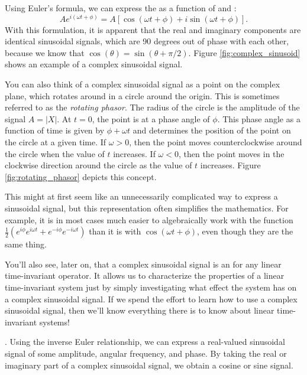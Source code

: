 Using Euler's formula, we can express the 
as a function of \index{$\cos$}{$\cos$} and \index{$\sin$}{$\sin$}:
\begin{equation}
  Ae^{i(\omega t + \phi)}= A[\cos(\omega t + \phi) + i \sin(\omega t + \phi)].
\end{equation}
With this formulation, it is apparent that the real and imaginary components are identical sinusoidal signals,
which are 90 degrees out of phase with each other, because we know that
$\cos(\theta) = \sin(\theta + \pi/2)$. Figure \ref{fig:complex_sinusoid}
shows an example of a complex sinusoidal signal.

You can also think of a complex sinusoidal signal as a point on the complex plane,
which rotates around in a circle around the origin. This is sometimes
referred to as the \emph{rotating phasor}. The radius of the circle is the
amplitude of the signal $A=|X|$. At $t=0$, the point is at a phase angle of $\phi$.
This phase angle as a function of time is given by $\phi + \omega t$ and determines the position
of the point on the circle at a given time. If $\omega>0$, then the point moves counterclockwise
around the circle when the value of $t$ increases. If $\omega < 0$, then the point moves
in the clockwise direction around the circle as the value of $t$ increases.
Figure \ref{fig:rotating_phasor} depicts this concept.

This might at first seem like an unnecessarily complicated way to express a sinusoidal signal,
but this representation often simplifies the mathematics. For example, it is in most cases
much easier to algebraically work with the function
$\frac{1}{2}(e^{i\phi}e^{i\omega t} + e^{-i\phi}e^{-i\omega t})$
than it is with $\cos(\omega t + \phi)$, even though they are the same thing.

You'll also see, later on, that a complex sinusoidal signal is
an \emph{} for any linear
time-invariant operator. It allows us to characterize the properties of
a linear time-invariant system just by simply investigating what
effect the system has on a complex sinusoidal signal. If we spend the effort
to learn how to use a complex sinusoidal signal, then we'll know everything
there is to know about linear time-invariant systems!

.
Using the inverse Euler relationship, we can express a real-valued sinusoidal signal
of some amplitude, angular frequency, and phase. By taking the real or imaginary part
of a complex sinusoidal signal, we obtain a cosine or sine signal.

